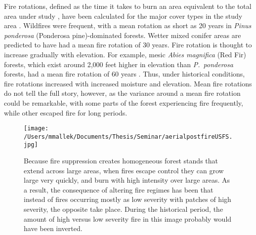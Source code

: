 Fire rotations, defined as the time it takes to burn an area equivalent to the total area under study \citep{Agee1993}, have been calculated for the major cover types in the study area \citep{Mallek2013}. Wildfires were frequent, with a mean rotation as short as 20 years in \emph{Pinus ponderosa} (Ponderosa pine)-dominated forests. Wetter mixed conifer areas are predicted to have had a mean fire rotation of 30 years. Fire rotation is thought to increase gradually with elevation. For example, mesic \emph{Abies magnifica} (Red Fir) forests, which exist around 2,000 feet higher in elevation than \emph{P.~ponderosa} forests, had a mean fire rotation of 60 years \citep{Mallek2013}. Thus, under historical conditions, fire rotations increased with increased moisture and elevation. Mean fire rotations do not tell the full story, however, as the variance around a mean fire rotation could be remarkable, with some parts of the forest experiencing fire frequently, while other escaped fire for long periods. 

\begin{wrapfigure}{O}{0.5\textwidth} %
\texttt{[image: /Users/mmallek/Documents/Thesis/Seminar/aerialpostfireUSFS.jpg]}
\caption{Because fire suppression creates homogeneous forest stands that extend across large areas, when fires escape control they can grow large very quickly, and burn with high intensity over large areas. As a result, the consequence of altering fire regimes has been that instead of fires occurring mostly as low severity with patches of high severity, the opposite take place. During the historical period, the amount of high versus low severity fire in this image probably would have been inverted.} 
\label{fig:bigfirephoto}
\end{wrapfigure} 


